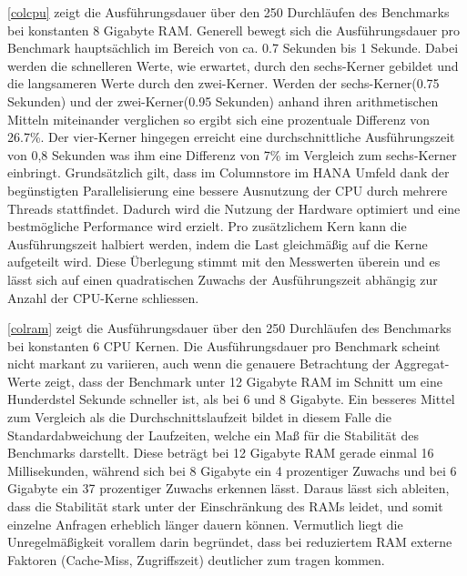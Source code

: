 \autoref{colcpu} zeigt die Ausführungsdauer über den 250 Durchläufen des Benchmarks bei konstanten 8 Gigabyte RAM. Generell bewegt sich die Ausführungsdauer pro Benchmark hauptsächlich im Bereich von ca. 0.7 Sekunden bis 1 Sekunde. Dabei werden die schnelleren Werte, wie erwartet, durch den sechs-Kerner gebildet und die langsameren Werte durch den zwei-Kerner. Werden der sechs-Kerner(0.75 Sekunden) und der zwei-Kerner(0.95 Sekunden) anhand ihren arithmetischen Mitteln miteinander verglichen so ergibt sich eine prozentuale Differenz von 26.7\%. Der vier-Kerner hingegen erreicht eine durchschnittliche Ausführungszeit von 0,8 Sekunden was ihm eine Differenz von 7\% im Vergleich zum sechs-Kerner einbringt. 
Grundsätzlich gilt, dass im Columnstore im HANA Umfeld dank der begünstigten Parallelisierung eine bessere Ausnutzung der CPU durch mehrere Threads stattfindet. Dadurch wird die Nutzung der Hardware optimiert und eine bestmögliche Performance wird erzielt. Pro zusätzlichem Kern kann die Ausführungszeit halbiert werden, indem die Last gleichmäßig auf die Kerne aufgeteilt wird. Diese Überlegung stimmt mit den Messwerten überein und es lässt sich auf einen quadratischen Zuwachs der Ausführungszeit abhängig zur Anzahl der CPU-Kerne schliessen. 

\begin{figure}[H]
\end{figure}

\autoref{colram} zeigt die Ausführungsdauer über den 250 Durchläufen des Benchmarks bei konstanten 6 CPU Kernen. Die Ausführungsdauer pro Benchmark scheint nicht markant zu variieren, auch wenn die genauere Betrachtung der Aggregat-Werte zeigt, dass der Benchmark unter 12 Gigabyte RAM im Schnitt um eine Hunderdstel Sekunde schneller ist, als bei 6 und 8 Gigabyte. Ein besseres Mittel zum Vergleich als die Durchschnittslaufzeit bildet in diesem Falle die Standardabweichung der Laufzeiten, welche ein Maß für die Stabilität des Benchmarks darstellt. Diese beträgt bei 12 Gigabyte RAM gerade einmal 16 Millisekunden, während sich bei 8 Gigabyte ein 4 prozentiger Zuwachs und bei 6 Gigabyte ein 37 prozentiger Zuwachs erkennen lässt. Daraus lässt sich ableiten, dass die Stabilität stark unter der Einschränkung des RAMs leidet, und somit einzelne Anfragen erheblich länger dauern können. Vermutlich liegt die Unregelmäßigkeit vorallem darin begründet, dass bei reduziertem RAM externe Faktoren (Cache-Miss, Zugriffszeit) deutlicher zum tragen kommen. 

